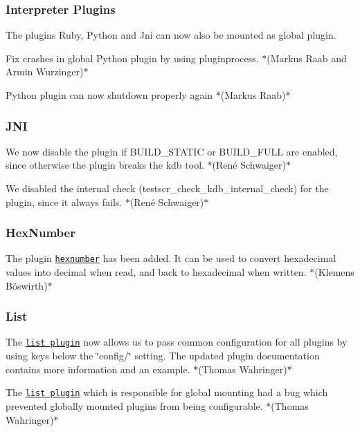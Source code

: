 \subsubsection*{Interpreter Plugins}


\begin{DoxyItemize}
\item The plugins Ruby, Python and Jni can now also be mounted as global plugin.
\item Fix crashes in global Python plugin by using pluginprocess. $\ast$(Markus Raab and Armin Wurzinger)$\ast$
\item Python plugin can now shutdown properly again $\ast$(Markus Raab)$\ast$
\end{DoxyItemize}

\subsubsection*{J\+NI}


\begin{DoxyItemize}
\item We now disable the plugin if {\ttfamily B\+U\+I\+L\+D\+\_\+\+S\+T\+A\+T\+IC} or {\ttfamily B\+U\+I\+L\+D\+\_\+\+F\+U\+LL} are enabled, since otherwise the plugin breaks the {\ttfamily kdb} tool. $\ast$(René Schwaiger)$\ast$
\item We disabled the internal check ({\ttfamily testscr\+\_\+check\+\_\+kdb\+\_\+internal\+\_\+check}) for the plugin, since it always fails. $\ast$(René Schwaiger)$\ast$
\end{DoxyItemize}

\subsubsection*{Hex\+Number}


\begin{DoxyItemize}
\item The plugin \href{https://www.libelektra.org/plugins/hexnumber}{\tt hexnumber} has been added. It can be used to convert hexadecimal values into decimal when read, and back to hexadecimal when written. $\ast$(Klemens Böswirth)$\ast$
\end{DoxyItemize}

\subsubsection*{List}


\begin{DoxyItemize}
\item The \href{http://libelektra.org/plugins/list}{\tt {\ttfamily list} plugin} now allows us to pass common configuration for all plugins by using keys below the \char`\"{}config/\char`\"{} setting. The updated plugin documentation contains more information and an example. $\ast$(Thomas Wahringer)$\ast$
\item The \href{http://libelektra.org/plugins/list}{\tt {\ttfamily list} plugin} which is responsible for global mounting had a bug which prevented globally mounted plugins from being configurable. $\ast$(Thomas Wahringer)$\ast$
\end{DoxyItemize}

